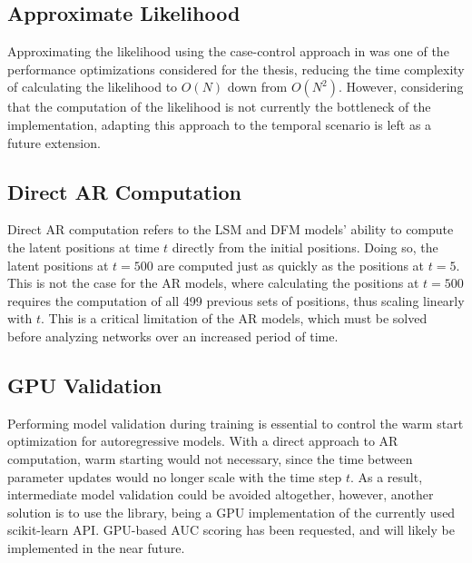 
\subsection{Approximate Likelihood}

    Approximating the likelihood using the case-control approach in  was one of the performance optimizations considered for the thesis, reducing the time complexity of calculating the likelihood to $O(N)$ down from $O(N^2)$. 
    However, considering that the computation of the likelihood is not currently the bottleneck of the implementation, adapting this approach to the temporal scenario is left as a future extension.

\subsection{Direct AR Computation}

    Direct AR computation refers to the LSM and DFM models' ability to compute the latent positions at time $t$ directly from the initial positions. Doing so, the latent positions at $t=500$ are computed just as quickly as the positions at $t=5$. This is not the case for the AR models, where calculating the positions at $t=500$ requires the computation of all 499 previous sets of positions, thus scaling linearly with $t$. This is a critical limitation of the AR models, which must be solved before analyzing networks over an increased period of time.

\subsection{GPU Validation}

    Performing model validation during training is essential to control the warm start optimization for autoregressive models. With a direct approach to AR computation, warm starting would not necessary, since the time between parameter updates would no longer scale with the time step $t$. As a result, intermediate model validation could be avoided altogether, however, another solution is to use the \href{https://github.com/h2oai/h2o4gpu}{\color{blue}{H2O4GPU}} library, being a GPU implementation of the currently used scikit-learn API. GPU-based AUC scoring has been requested, and will likely be implemented in the near future.
    
